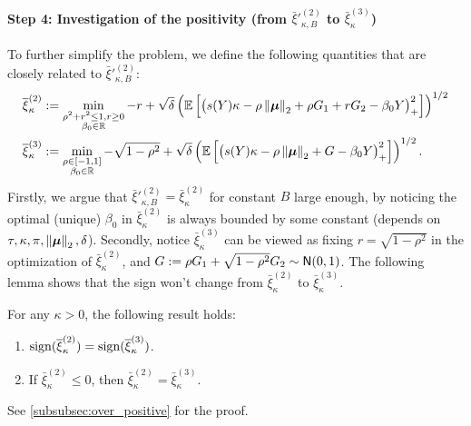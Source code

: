 \paragraph{Step 4: Investigation of the positivity (from $\bar\xi'^{(2)}_{\kappa, B}$ to $\bar\xi^{(3)}_{\kappa}$)}
To further simplify the problem, we define the following quantities that are closely related to $\bar\xi'^{(2)}_{\kappa, B}$:
\begin{align}
        \overline\xi_{\kappa}^{(2)} & :=  \min_{ \substack{ \rho^2 + r^2 \le 1, r \ge 0 \\  \beta_0 \in  \mathbb{R} } }
    -r + \sqrt{\delta} \left( \mathbb{E}\left[ \bigl(  s(Y) \kappa - \rho \left\|{\text{\boldmath $\mu$}}\right\|_2 + \rho G_1 + rG_2 - \beta_0 Y \bigr)_+^2 \right] \right)^{1/2} 
    \notag
    \\
        \overline\xi_{\kappa}^{(3)} & :=  \min_{ \substack{ \rho \in [-1, 1] \\  \beta_0 \in  \mathbb{R} } }
        -\sqrt{1 - \rho^2} + \sqrt{\delta} \left( \mathbb{E}\left[ \bigl(  s(Y) \kappa - \rho \left\|{\text{\boldmath $\mu$}}\right\|_2 + G - \beta_0 Y \bigr)_+^2 \right] \right)^{1/2}.
        \label{eq:xi3_kappa}
\end{align}
Firstly, we argue that $\bar\xi'^{(2)}_{\kappa, B} = \bar\xi_{\kappa}^{(2)}$ for constant $B$ large enough, by noticing the optimal (unique) $\beta_0$ in $\bar\xi_{\kappa}^{(2)}$ is always bounded by some constant (depends on $\tau, \kappa, \pi, \left\|{\text{\boldmath $\mu$}}\right\|_2, \delta$). Secondly, notice $\bar\xi_{\kappa}^{(3)}$ can be viewed as fixing $r = \sqrt{1 - \rho^2}$ in the optimization of $\bar\xi_{\kappa}^{(2)}$, and $G := \rho G_1 + \sqrt{1 - \rho^2} G_2 \sim {\sf N}(0, 1)$. The following lemma shows that the sign won't change from $\bar\xi_{\kappa}^{(2)}$ to $\bar\xi_{\kappa}^{(3)}$.

\begin{lem} 
\label{lem:over_sign}    
For any $\kappa > 0$, the following result holds:
    \begin{enumerate}[label=(\alph*)]
        \item $\mathrm{sign}(\overline\xi_{\kappa}^{(2)}) = \mathrm{sign}(\overline\xi_{\kappa}^{(3)})$.
        \item If $\bar\xi_{\kappa}^{(2)} \le 0$, then $\bar\xi_{\kappa}^{(2)} = \bar\xi_{\kappa}^{(3)}$.
    \end{enumerate}
\end{lem}
\noindent
See \cref{subsubsec:over_positive} for the proof.



